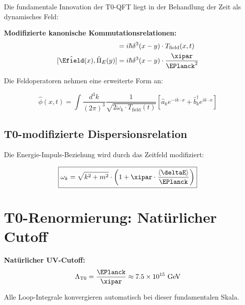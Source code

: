 	Die fundamentale Innovation der T0-QFT liegt in der Behandlung der Zeit als dynamisches Feld:
	
	\begin{tcolorbox}[colback=green!5!white,colframe=green!75!black,title=T0-Kanonische Quantisierung]
		\textbf{Modifizierte kanonische Kommutationsrelationen:}
		\begin{align}
			[\hat{\phi}(x), \hat{\pi}(y)] &= i\hbar \delta^3(x-y) \cdot T_{\text{field}}(x,t) \\
			[\hat{\Efield}(x), \hat{\Pi}_E(y)] &= i\hbar \delta^3(x-y) \cdot \frac{\xipar}{\EPlanck^2}
		\end{align}
	\end{tcolorbox}
	
	Die Feldoperatoren nehmen eine erweiterte Form an:
	
	\begin{equation}
		\hat{\phi}(x,t) = \int \frac{d^3k}{(2\pi)^3} \frac{1}{\sqrt{2\omega_k \cdot T_{\text{field}}(t)}} \left[\hat{a}_k e^{-ik \cdot x} + \hat{b}^\dagger_k e^{ik \cdot x}\right]
	\end{equation}
	
	\subsection{T0-modifizierte Dispersionsrelation}
	
	Die Energie-Impuls-Beziehung wird durch das Zeitfeld modifiziert:
	
	\begin{equation}
		\boxed{\omega_k = \sqrt{k^2 + m^2} \cdot \left(1 + \xipar \cdot \frac{\langle\deltaE\rangle}{\EPlanck}\right)}
	\end{equation}
	
	\section{T0-Renormierung: Natürlicher Cutoff}
	
	\begin{tcolorbox}[colback=red!5!white,colframe=red!75!black,title=T0-Renormierung]
		\textbf{Natürlicher UV-Cutoff:}
		\begin{equation}
			\Lambda_{\text{T0}} = \frac{\EPlanck}{\xipar} \approx 7.5 \times 10^{15} \text{ GeV}
		\end{equation}
		
		Alle Loop-Integrale konvergieren automatisch bei dieser fundamentalen Skala.
	\end{tcolorbox}
	
